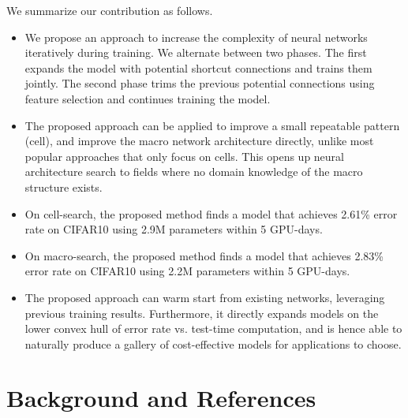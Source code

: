 We summarize our contribution as follows.
\begin{itemize}
\item We propose an approach to increase the complexity of neural networks iteratively during training. We alternate between two phases. The first expands the model with potential shortcut connections and trains them jointly. The second phase trims the previous potential connections using feature selection and continues training the model. 
\item The proposed approach can be applied to improve a small repeatable pattern (cell), and improve the macro network architecture directly, unlike most popular approaches that only focus on cells. This opens up neural architecture search to fields where no domain knowledge of the macro structure exists. 
\item On cell-search, the proposed method finds a model that achieves 2.61\% error rate on CIFAR10 using 2.9M parameters within 5 GPU-days. 
\item On macro-search, the proposed method finds a model that achieves 2.83\% error rate on CIFAR10 using 2.2M parameters within 5 GPU-days. 
\item The proposed approach can warm start from existing networks, leveraging previous training results. Furthermore, it directly expands models on the lower convex hull of error rate vs. test-time computation, and is hence able to naturally produce a gallery of cost-effective models for applications to choose. 
\end{itemize}


\section{Background and References}

